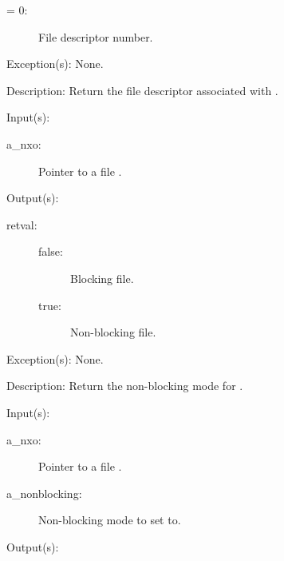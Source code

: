 \begin{capi}
\begin{capilist}
\begin{description}
\begin{description}
			\item[{\gt}= 0: ]
				File descriptor number.
			\end{description}
		\end{description}
	\item[Exception(s): ] None.
	\item[Description: ]
		Return the file descriptor associated with .
	\end{capilist}
\label{nxo_file_nonblocking_get}
	\begin{capilist}
	\item[Input(s): ]
		\begin{description}\item[]
		\item[a\_nxo: ]
			Pointer to a file .
		\end{description}
	\item[Output(s): ]
		\begin{description}\item[]
		\item[retval: ]
			\begin{description}\item[]
			\item[false: ]
				Blocking file.
			\item[true: ]
				Non-blocking file.
			\end{description}
		\end{description}
	\item[Exception(s): ] None.
	\item[Description: ]
		Return the non-blocking mode for .
	\end{capilist}
\label{nxo_file_nonblocking_set}
	\begin{capilist}
	\item[Input(s): ]
		\begin{description}\item[]
		\item[a\_nxo: ]
			Pointer to a file \classname{nxo}.
		\item[a\_nonblocking: ]
			Non-blocking mode to set \classname{nxo} to.
		\end{description}
	\item[Output(s): ]

\end{capilist}
\end{capi}
